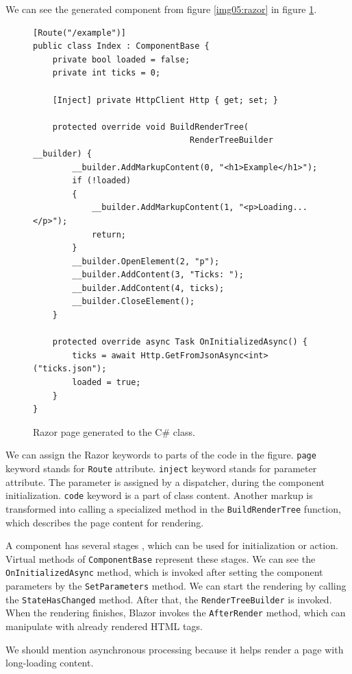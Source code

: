 We can see the generated component from figure \ref{img05:razor} in figure \ref{img06:component}.
\par
\begin{figure}[t]
\begin{lstlisting}
[Route("/example")]
public class Index : ComponentBase {
    private bool loaded = false;
    private int ticks = 0;
	
    [Inject] private HttpClient Http { get; set; }

    protected override void BuildRenderTree(
    							RenderTreeBuilder __builder) {
        __builder.AddMarkupContent(0, "<h1>Example</h1>");
        if (!loaded)
        {
            __builder.AddMarkupContent(1, "<p>Loading...</p>");
            return;
        }
        __builder.OpenElement(2, "p");
        __builder.AddContent(3, "Ticks: ");
        __builder.AddContent(4, ticks);
        __builder.CloseElement();
    }

    protected override async Task OnInitializedAsync() {
        ticks = await Http.GetFromJsonAsync<int>("ticks.json");
        loaded = true;
    }
}
\end{lstlisting}
\caption{Razor page generated to the C\# class.}
\label{img06:component}
\end{figure}
\par
We can assign the Razor keywords to parts of the code in the figure.
\texttt{page} keyword stands for \texttt{Route} attribute.
\texttt{inject} keyword stands for parameter attribute. 
The parameter is assigned by a dispatcher, during the component initialization.
\texttt{code} keyword is a part of class content.
Another markup is transformed into calling a specialized method in the \texttt{BuildRenderTree} function, which describes the page content for rendering.
\par
A component has several stages \cite{online:lifecycle}, which can be used for initialization or action.
Virtual methods of \texttt{ComponentBase} represent these stages.
We can see the \texttt{OnInitializedAsync} method, which is invoked after setting the component parameters by the \texttt{SetParameters} method.
We can start the rendering by calling the \texttt{StateHasChanged} method.
After that, the \texttt{RenderTreeBuilder} is invoked.
When the rendering finishes, Blazor invokes the \texttt{AfterRender} method, which can manipulate with already rendered HTML tags.
\par
We should mention asynchronous processing because it helps render a page with long-loading content.
